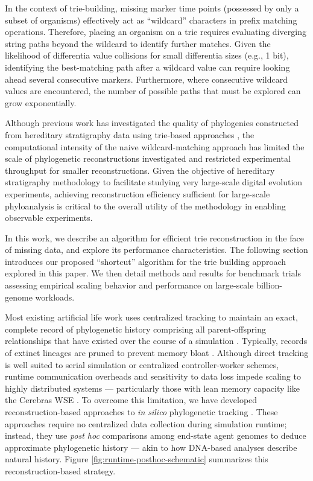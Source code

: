 In the context of trie-building, missing marker time points (possessed by only a subset of organisms) effectively act as ``wildcard'' characters in prefix matching operations.
Therefore, placing an organism on a trie requires evaluating diverging string paths beyond the wildcard to identify further matches.
Given the likelihood of differentia value collisions for small differentia sizes (e.g., 1 bit), identifying the best-matching path after a wildcard value can require looking ahead several consecutive markers.
Furthermore, where consecutive wildcard values are encountered, the number of possible paths that must be explored can grow exponentially.

Although previous work has investigated the quality of phylogenies constructed from hereditary stratigraphy data using trie-based approaches \citep{moreno2025testing}, the computational intensity of the naive wildcard-matching approach has limited the scale of phylogenetic reconstructions investigated and restricted experimental throughput for smaller reconstructions.
Given the objective of hereditary stratigraphy methodology to facilitate studying very large-scale digital evolution experiments, achieving reconstruction efficiency sufficient for large-scale phyloanalysis is critical to the overall utility of the methodology in enabling observable experiments.

In this work, we describe an algorithm for efficient trie reconstruction in the face of missing data, and explore its performance characteristics.
The following section introduces our proposed ``shortcut'' algorithm for the trie building approach explored in this paper.
We then detail methods and results for benchmark trials assessing empirical scaling behavior and performance on large-scale billion-genome workloads.

Most existing artificial life work uses centralized tracking to maintain an exact, complete record of phylogenetic history comprising all parent-offspring relationships that have existed over the course of a simulation \citep{ray1992evolution,bohm2017mabe,de2012deap,garwood2019revosim,godin2019apoget,dolson2024phylotrackpy}.
Typically, records of extinct lineages are pruned to prevent memory bloat \citep{moreno2024analysis}.
Although direct tracking is well suited to serial simulation or centralized controller-worker schemes, runtime communication overheads and sensitivity to data loss impede scaling to highly distributed systems --- particularly those with lean memory capacity like the Cerebras WSE \citep{moreno2024analysis}.
To overcome this limitation, we have developed reconstruction-based approaches to \textit{in silico} phylogenetic tracking \citep{moreno2022hereditary}.
These approaches require no centralized data collection during simulation runtime; instead, they use \textit{post hoc} comparisons among end-state agent genomes to deduce approximate phylogenetic history --- akin to how DNA-based analyses describe natural history.
Figure \ref{fig:runtime-posthoc-schematic} summarizes this reconstruction-based strategy.

